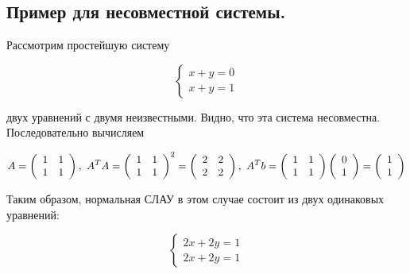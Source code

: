 \subsection{
    Пример для несовместной системы.
}

\begin{example}
    Рассмотрим простейшую систему

    \begin{equation}
        \begin{cases}
            x + y = 0 \\
            x + y = 1
        \end{cases}
    \end{equation}

    двух уравнений с двумя неизвестными. Видно, что эта система несовместна. Последовательно вычисляем

    \begin{equation}
        A = \left(\begin{array}{cc}
            1 & 1 \\
            1 & 1
        \end{array}\right), \thinspace \thinspace
        A^TA = \left(\begin{array}{cc}
            1 & 1 \\
            1 & 1
        \end{array}\right)^2 = \left(\begin{array}{cc}
            2 & 2 \\
            2 & 2
        \end{array}\right), \thinspace \thinspace
        A^Tb = \left(\begin{array}{cc}
            1 & 1 \\
            1 & 1
        \end{array}\right)\left(\begin{array}{c}
            0 \\
            1
        \end{array}\right) = \left(\begin{array}{c}
            1 \\
            1
        \end{array}\right)
    \end{equation}

    Таким образом, нормальная СЛАУ в этом случае состоит из двух одинаковых уравнений:

    \begin{equation}
        \begin{cases}
            2x + 2y = 1 \\
            2x + 2y = 1
        \end{cases}
    \end{equation}


\end{example}
